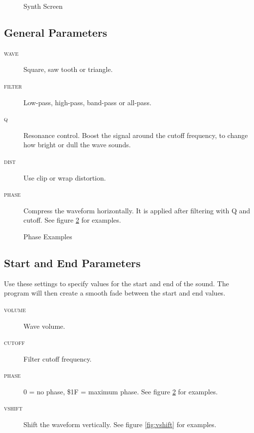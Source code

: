 \begin{figure}[htbp]
	\begin{center}
	\end{center}
	\caption{Synth Screen}
	\label{fig:synth}
\end{figure}

\subsection{General Parameters}

\begin{description}
\item[\textsc{wave}] Square, saw tooth or triangle.
\item[\textsc{filter}] Low-pass, high-pass, band-pass or all-pass.
\item[\textsc{q}] Resonance control. Boost the signal around the cutoff frequency, to change how bright or dull the wave sounds.
\item[\textsc{dist}] Use clip or wrap distortion.
\item[\textsc{phase}] \label{phase}
Compress the waveform horizontally. It is applied after filtering with Q and cutoff. See figure \ref{fig:phasing} for examples.
\end{description}

\begin{figure}[hbtp]
	\centering
	\qquad

	\qquad
	\caption{Phase Examples}
	\label{fig:phasing}
\end{figure}

\subsection{Start and End Parameters}

Use these settings to specify values for the start and end of the sound. The program will then create a smooth fade between the start and end values.

\begin{description}
\item[\textsc{volume}] Wave volume.
\item[\textsc{cutoff}] Filter cutoff frequency.
\item[\textsc{phase}] 0 = no phase, \$1F = maximum phase. See figure \ref{fig:phasing} for examples.
\item[\textsc{vshift}] Shift the waveform vertically. See figure \ref{fig:vshift} for examples.
\end{description}

